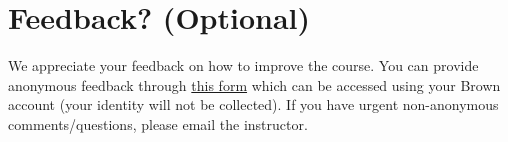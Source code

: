 




\pagebreak
\section*{Feedback? (Optional)}
We appreciate your feedback on how to improve the course. You can provide anonymous feedback through \href{https://forms.gle/cvFQKUTJELGQ9mNB6}{this form} which can be accessed using your Brown account (your identity will not be collected). If you have urgent non-anonymous comments/questions, please email the instructor.





